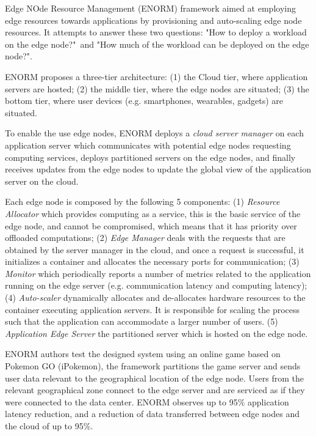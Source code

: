 Edge NOde Resource Management \cite{wang2017enorm} (ENORM) framework aimed at employing edge resources towards applications by provisioning and auto-scaling edge node resources. It attempts to answer these two questions: "How to deploy a workload on the edge node?"\ and "How much of the workload can be deployed on the edge node?".

ENORM proposes a three-tier architecture: (1) the Cloud tier, where application servers are hosted; (2) the middle tier, where the edge nodes are situated; (3) the bottom tier, where user devices (e.g. smartphones, wearables, gadgets) are situated. 

To enable the use edge nodes, ENORM deploys a \textit{cloud server manager} on each application server which communicates with potential edge nodes requesting computing services, deploys partitioned servers on the edge nodes, and finally receives updates from the edge nodes to update the global view of the application server on the cloud.

Each edge node is composed by the following 5 components: (1) \textit{Resource Allocator} which provides computing as a service, this is the basic service of the edge node, and cannot be compromised, which means that it has priority over offloaded computations; (2) \textit{Edge Manager} deals with the requests that are obtained by the server manager in the cloud, and once a request is successful, it initializes a container and allocates the necessary ports for communication; (3) \textit{Monitor} which periodically reports a number of metrics related to the application running on the edge server (e.g. communication latency and computing latency); (4) \textit{Auto-scaler} dynamically allocates and de-allocates hardware resources to the container executing application servers. It is responsible for scaling the process such that the application can accommodate a larger number of users. (5) \textit{Application Edge Server} the partitioned server which is hosted on the edge node.

ENORM authors test the designed system using an online game based on Pokemon GO (iPokemon)\cite{pokemonGo}, the framework partitions the game server and sends  user data relevant to the geographical location of the edge node. Users from the relevant geographical zone connect to the edge server and are serviced as if they were connected to the data center. ENORM observes up to 95\% application latency reduction, and a reduction of data transferred between edge nodes and the cloud of up to 95\%.

